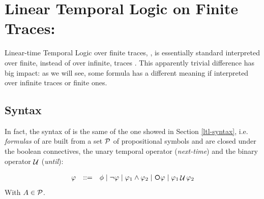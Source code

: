 %

\section{Linear Temporal Logic on Finite Traces: \LTLf}
\label{ltlf}
Linear-time Temporal Logic over finite traces, \LTLf, is essentially standard 
\LTL \citep{Pnueli:1977:TLP:1382431.1382534} interpreted over finite, instead of over infinite, traces \citep{de2013linear}.
This apparently trivial difference has big impact: as we will see, some \LTL formula has a different meaning if interpreted over infinite traces or finite ones.

\subsection{Syntax}\label{ltlf-syntax}
In fact, the syntax of \LTLf is the same of the one showed in Section \ref{ltl-syntax}, i.e. \emph{formulas} of \LTLf are built from a set $\mathcal{P}$ of propositional symbols and are closed under the boolean connectives, the unary temporal operator \Next (\emph{next-time}) and the binary operator $\mathop{\mathcal{U}}$ (\emph{until}):

\[\begin{array}{rcl}
\varphi &::=& \phi \mid \lnot \varphi \mid \varphi_1\land \varphi_2 \mid \Next\varphi \mid \varphi_1 \lUntil \varphi_2
\end{array}
\]
With $A\in \mathcal{P}$.

